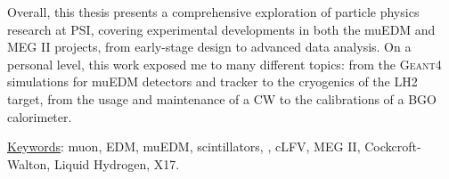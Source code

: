 \noindent
Overall, this thesis presents a comprehensive exploration of particle physics research at PSI, covering experimental developments in both the muEDM and MEG II projects, from early-stage design to advanced data analysis.
On a personal level, this work exposed me to many different topics: from the \textsc{Geant4} simulations for muEDM detectors and tracker to the cryogenics of the LH2 target, from the usage and maintenance of a CW to the calibrations of a BGO calorimeter.

\vfill
\begin{center}
\begin{minipage}{0.6\textwidth}
\underline{Keywords}: muon, EDM, muEDM, scintillators, \gf, cLFV, MEG II, Cockcroft-Walton, Liquid Hydrogen, X17.
\end{minipage}
\end{center}

\thispagestyle{empty}
\mbox{}